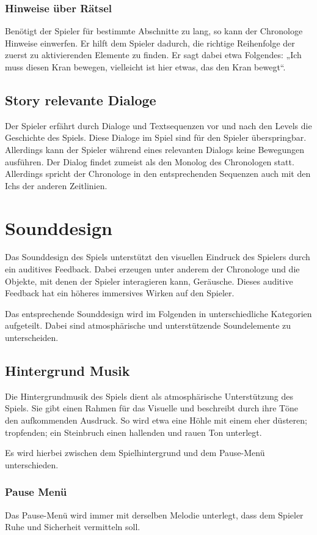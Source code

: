 \subsubsection{Hinweise über Rätsel}
Benötigt der Spieler für bestimmte Abschnitte zu lang, so kann der Chronologe Hinweise einwerfen. Er hilft dem Spieler dadurch, die richtige Reihenfolge der zuerst zu aktivierenden Elemente zu finden. Er sagt dabei etwa Folgendes: „Ich muss diesen Kran bewegen, vielleicht ist hier etwas, das den Kran bewegt“. 

\subsection{Story relevante Dialoge}
Der Spieler erfährt durch Dialoge und Textsequenzen vor und nach den Levels die Geschichte des Spiels. Diese Dialoge im Spiel sind für den Spieler überspringbar. Allerdings kann der Spieler während eines relevanten Dialogs keine Bewegungen ausführen. Der Dialog findet zumeist als den Monolog des Chronologen statt. Allerdings spricht der Chronologe in den entsprechenden Sequenzen auch mit den Ichs der anderen Zeitlinien. 

\section{Sounddesign}
Das Sounddesign des Spiels unterstützt den visuellen Eindruck des Spielers durch ein auditives Feedback. Dabei erzeugen unter anderem der Chronologe und die Objekte, mit denen der Spieler interagieren kann, Geräusche. Dieses auditive Feedback hat ein höheres immersives Wirken auf den Spieler.

Das entsprechende Sounddesign wird im Folgenden in unterschiedliche Kategorien aufgeteilt. Dabei sind atmosphärische und unterstützende Soundelemente zu unterscheiden.

\subsection{Hintergrund Musik}
Die Hintergrundmusik des Spiels dient als atmosphärische Unterstützung des Spiels. Sie gibt einen Rahmen für das Visuelle und beschreibt durch ihre Töne den aufkommenden Ausdruck. So wird etwa eine Höhle mit einem eher düsteren; tropfenden; ein Steinbruch einen hallenden und rauen Ton unterlegt.

Es wird hierbei zwischen dem Spielhintergrund und dem Pause-Menü unterschieden.

\subsubsection{Pause Menü}
Das Pause-Menü wird immer mit derselben Melodie unterlegt, dass dem Spieler Ruhe und Sicherheit vermitteln soll. 

